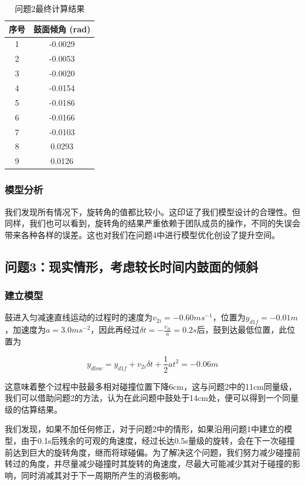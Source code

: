 \documentclass[nocover]{cumcmart}%
\begin{document}
\begin{table} [!h]
\begin{center}
\vspace{-0.1in}
\caption{问题2最终计算结果}
\label{table:result2}
\begin{tabular}{|c|c|}
\hline
\textbf{序号}&\textbf{鼓面倾角 (rad)}\\
\hline
1&-0.0029
\\
\hline
2& -0.0053\\
\hline
3& -0.0020
\\
\hline
4&-0.0154\\
\hline
5&-0.0186\\
\hline
6&-0.0166\\
\hline
7&-0.0103\\
\hline
8&0.0293\\
\hline
9&0.0126\\
\hline
\end{tabular}
\vspace{-0.2in}
\end{center}
\end{table}     

\subsubsection{模型分析}
我们发现所有情况下，旋转角的值都比较小。这印证了我们模型设计的合理性。但同样，我们也可以看到，旋转角的结果严重依赖于团队成员的操作，不同的失误会带来各种各样的误差。这也对我们在问题4中进行模型优化创设了提升空间。
\subsection{问题3：现实情形，考虑较长时间内鼓面的倾斜}
\subsubsection{建立模型}

鼓进入匀减速直线运动的过程时的速度为$v_{2i} = -0.60 ms^{-1}$，位置为$y_{d1f} = -0.01m$，加速度为$a = 3.0ms^{-2}$，因此再经过$\delta t = -\frac{v_{2i}}{a} = 0.2s$后，鼓到达最低位置，此位置为

$$y_{dlow} = y_{d1f} + v_{2i}\delta t + \frac{1}{2}at^2 = -0.06m$$

这意味着整个过程中鼓最多相对碰撞位置下降6cm，这与问题2中的11cm同量级，我们可以借助问题2的方法，认为在此问题中鼓处于14cm处，便可以得到一个同量级的估算结果。

我们发现，如果不加任何修正，对于问题2中的情形，如果沿用问题1中建立的模型，由于0.1s后残余的可观的角速度，经过长达0.5s量级的旋转，会在下一次碰撞前达到巨大的旋转角度，继而将球碰偏。为了解决这个问题，我们努力减少碰撞前转过的角度，并尽量减少碰撞时其旋转的角速度，尽最大可能减少其对于碰撞的影响，同时消减其对于下一周期所产生的消极影响。
\end{document}
